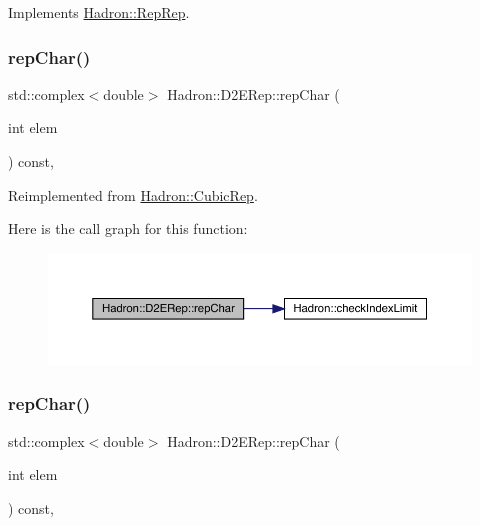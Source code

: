 Implements \mbox{\hyperlink{structHadron_1_1RepRep_ab3213025f6de249f7095892109575fde}{Hadron\+::\+Rep\+Rep}}.

\mbox{\label{structHadron_1_1D2ERep_a0507e2c08a6c305e5f0fc4f36a92f0be}} 
\subsubsection{\texorpdfstring{repChar()}{repChar()}\hspace{0.1cm}{\footnotesize\ttfamily [1/3]}}
{\footnotesize\ttfamily std\+::complex$<$double$>$ Hadron\+::\+D2\+E\+Rep\+::rep\+Char (\begin{DoxyParamCaption}\item[{int}]{elem }\end{DoxyParamCaption}) const\hspace{0.3cm}{\ttfamily [inline]}, {\ttfamily [virtual]}}



Reimplemented from \mbox{\hyperlink{structHadron_1_1CubicRep_af45227106e8e715e84b0af69cd3b36f8}{Hadron\+::\+Cubic\+Rep}}.

Here is the call graph for this function\+:
\nopagebreak
\begin{figure}[H]
\begin{center}
\leavevmode
\includegraphics[width=350pt]{d4/d82/structHadron_1_1D2ERep_a0507e2c08a6c305e5f0fc4f36a92f0be_cgraph}
\end{center}
\end{figure}
\mbox{\label{structHadron_1_1D2ERep_a0507e2c08a6c305e5f0fc4f36a92f0be}} 
\subsubsection{\texorpdfstring{repChar()}{repChar()}\hspace{0.1cm}{\footnotesize\ttfamily [2/3]}}
{\footnotesize\ttfamily std\+::complex$<$double$>$ Hadron\+::\+D2\+E\+Rep\+::rep\+Char (\begin{DoxyParamCaption}\item[{int}]{elem }\end{DoxyParamCaption}) const\hspace{0.3cm}{\ttfamily [inline]}, {\ttfamily [virtual]}}



